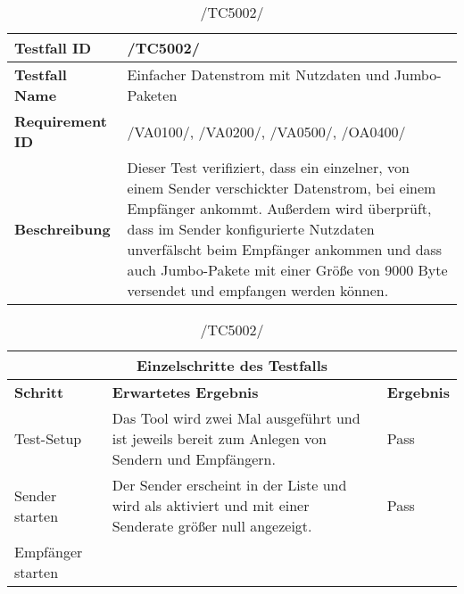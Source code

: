     \begin{table}[h]
        \caption{/TC5002/}
        \label{tab:TC5002}
        \begin{center}
            \begin{tabular}{|p{3.5cm}|p{11cm}|}
                \hline
                    \textbf{Testfall ID} & /TC5002/\\
                \hline
                    \textbf{Testfall Name} & Einfacher Datenstrom mit
                                             Nutzdaten und Jumbo-Paketen\\
                \hline
                    \textbf{Requirement ID} & /VA0100/, /VA0200/, /VA0500/,
                    /OA0400/\\
                \hline
                    \textbf{Beschreibung} & Dieser Test verifiziert, dass ein
                                            einzelner, von einem Sender
                                            verschickter Datenstrom, bei einem
                                            Empfänger ankommt. Außerdem wird
                                            überprüft, dass im Sender
                                            konfigurierte Nutzdaten
                                            unverfälscht beim Empfänger
                                            ankommen und dass auch
                                            Jumbo-Pakete mit einer Größe von
                                            9000 Byte versendet und empfangen
                                            werden können.\\
                \hline
            \end{tabular}
\begin{tabular}{|p{4cm}|p{7.8cm}|p{2.3cm}|}
\multicolumn{3}{|c|}{\textbf{Einzelschritte des Testfalls}} \\
                \hline
                    \textbf{Schritt} & \textbf{Erwartetes Ergebnis} & \textbf{Ergebnis}\\
                \hline
                    Test-Setup &
                    Das Tool wird zwei Mal ausgeführt und ist jeweils bereit zum
                    Anlegen von Sendern und Empfängern.& Pass\\
                \hline
                    Sender starten 
                    & Der Sender erscheint in
                    der Liste und wird als aktiviert und mit einer Senderate
                    größer null angezeigt.& Pass\\
                \hline
                    Empfänger starten &

\end{tabular}
\end{center}
\end{table}
